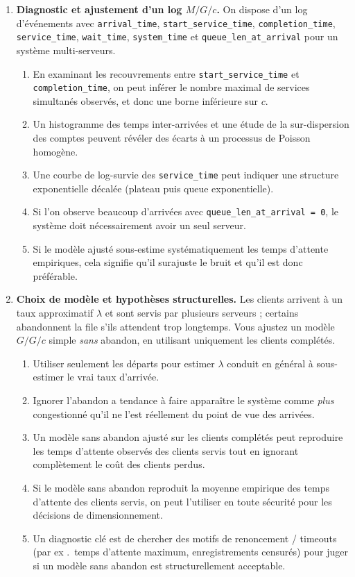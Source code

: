 \documentclass[a4paper,11pt]{article}
\begin{document}
\begin{enumerate}
\item \textbf{Diagnostic et ajustement d'un log $M/G/c$.} On dispose d'un log d'événements avec \texttt{arrival\_time}, \texttt{start\_service\_time}, \texttt{completion\_time}, \texttt{service\_time}, \texttt{wait\_time}, \texttt{system\_time} et \texttt{queue\_len\_at\_arrival} pour un système multi-serveurs.
  \begin{enumerate}
    \item En examinant les recouvrements entre \texttt{start\_service\_time} et \texttt{completion\_time}, on peut inférer le nombre maximal de services simultanés observés, et donc une borne inférieure sur $c$.
    \item Un histogramme des temps inter-arrivées et une étude de la sur-dispersion des comptes peuvent révéler des écarts à un processus de Poisson homogène.
    \item Une courbe de log-survie des \texttt{service\_time} peut indiquer une structure exponentielle décalée (plateau puis queue exponentielle).
    \item Si l'on observe beaucoup d'arrivées avec \texttt{queue\_len\_at\_arrival = 0}, le système doit nécessairement avoir un seul serveur.
    \item Si le modèle ajusté sous-estime systématiquement les temps d'attente empiriques, cela signifie qu'il surajuste le bruit et qu'il est donc préférable.
  \end{enumerate}

\item \textbf{Choix de modèle et hypothèses structurelles.} Les clients arrivent à un taux approximatif $\lambda$ et sont servis par plusieurs serveurs ; certains abandonnent la file s'ils attendent trop longtemps. Vous ajustez un modèle $G/G/c$ simple \emph{sans} abandon, en utilisant uniquement les clients complétés.
  \begin{enumerate}
    \item Utiliser seulement les départs pour estimer $\lambda$ conduit en général à sous-estimer le vrai taux d'arrivée.
    \item Ignorer l'abandon a tendance à faire apparaître le système comme \emph{plus} congestionné qu'il ne l'est réellement du point de vue des arrivées.
    \item Un modèle sans abandon ajusté sur les clients complétés peut reproduire les temps d'attente observés des clients servis tout en ignorant complètement le coût des clients perdus.
    \item Si le modèle sans abandon reproduit la moyenne empirique des temps d'attente des clients servis, on peut l'utiliser en toute sécurité pour les décisions de dimensionnement.
    \item Un diagnostic clé est de chercher des motifs de renoncement / timeouts (par ex .\ temps d'attente maximum, enregistrements censurés) pour juger si un modèle sans abandon est structurellement acceptable.
  \end{enumerate}


\end{enumerate}
\end{document}
